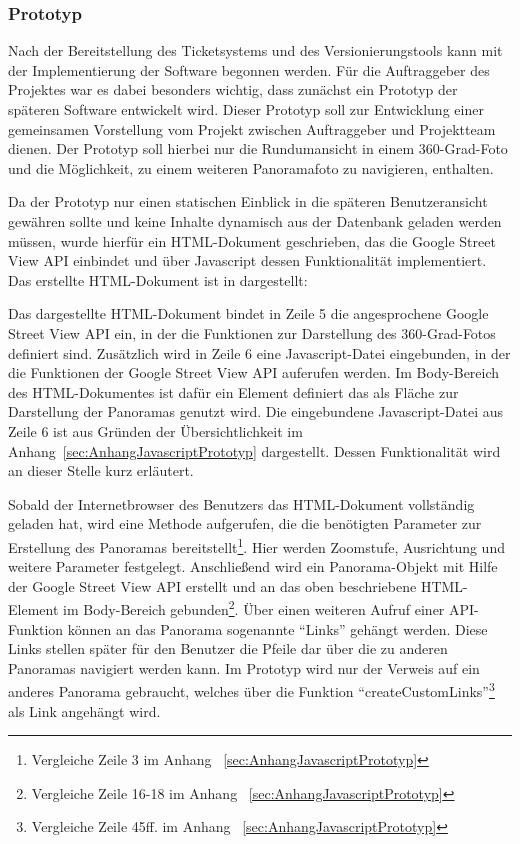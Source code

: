 \subsubsection{Prototyp}
\label{sec:Prototyp}

Nach der Bereitstellung des Ticketsystems und des Versionierungstools kann mit
der Implementierung der Software begonnen werden. Für die Auftraggeber des
Projektes war es dabei besonders wichtig, dass zunächst ein Prototyp der
späteren Software entwickelt wird. Dieser Prototyp soll zur Entwicklung einer
gemeinsamen Vorstellung vom Projekt zwischen Auftraggeber und Projektteam
dienen. Der Prototyp soll hierbei nur die Rundumansicht in einem
360-Grad-Foto und die Möglichkeit, zu einem weiteren Panoramafoto zu navigieren,
enthalten.

Da der Prototyp nur einen statischen Einblick in die späteren Benutzeransicht
gewähren sollte und keine Inhalte dynamisch aus der Datenbank geladen werden
müssen, wurde hierfür ein HTML-Dokument geschrieben, das die Google Street View
API einbindet und über Javascript dessen Funktionalität implementiert. Das
erstellte HTML-Dokument ist in  dargestellt:



Das dargestellte HTML-Dokument bindet in Zeile 5 die angesprochene Google
Street View API ein, in der die Funktionen zur Darstellung des 360-Grad-Fotos
definiert sind. Zusätzlich wird in Zeile 6 eine Javascript-Datei eingebunden,
in der die Funktionen der Google Street View API auferufen werden. Im
Body-Bereich des HTML-Dokumentes ist dafür ein Element definiert das als Fläche
zur Darstellung der Panoramas genutzt wird. Die eingebundene Javascript-Datei
aus Zeile 6 ist aus Gründen der Übersichtlichkeit
im Anhang~\ref{sec:AnhangJavascriptPrototyp} dargestellt. Dessen Funktionalität
wird an dieser Stelle kurz erläutert.

Sobald der Internetbrowser des Benutzers das HTML-Dokument vollständig geladen
hat, wird eine Methode aufgerufen, die die benötigten Parameter zur Erstellung
des Panoramas bereitstellt\footnote{Vergleiche Zeile 3 im Anhang
~\ref{sec:AnhangJavascriptPrototyp}}. Hier werden Zoomstufe, Ausrichtung und
weitere Parameter festgelegt. Anschließend wird ein Panorama-Objekt mit Hilfe
der Google Street View API erstellt und an das oben beschriebene HTML-Element
im Body-Bereich gebunden\footnote{Vergleiche Zeile 16-18 im Anhang
~\ref{sec:AnhangJavascriptPrototyp}}. Über einen weiteren Aufruf einer
API-Funktion können an das Panorama sogenannte "`Links"' gehängt werden. Diese
Links stellen später für den Benutzer die Pfeile dar über die zu anderen
Panoramas navigiert werden kann. Im Prototyp wird nur der Verweis auf ein
anderes Panorama gebraucht, welches über die Funktion
"`createCustomLinks"'\footnote{Vergleiche Zeile 45ff. im Anhang
~\ref{sec:AnhangJavascriptPrototyp}} als Link angehängt wird.

